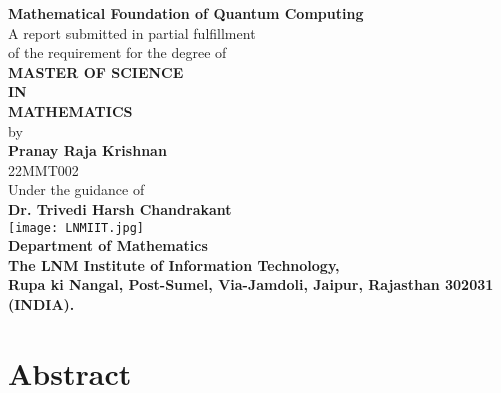 \documentclass[12pt,twoside,fleqn]{report}
\theoremstyle{thmstyle}
\begin{document}
\begin{titlepage}
    \begin{center}
        \vspace*{0.15cm}
        \Huge{\textbf{\large Mathematical Foundation of Quantum Computing}}\\
        \vspace{0.25cm}
        \small
        A report submitted in partial fulfillment\\
        of the requirement for the  degree of  \\
        \vspace{0.15cm}
        \textbf{MASTER OF SCIENCE \\ IN \\ MATHEMATICS}\\
        \vspace{0.25cm}
        by\\ \vspace{0.25cm}
        \large
        \textbf{Pranay Raja Krishnan}\\
        \vspace{0.15cm}
        \large{22MMT002}\\
        \vspace{0.15cm}
        Under the guidance of\\
        \vspace{0.15cm}
        \textbf{Dr. Trivedi Harsh Chandrakant}\\

        \vspace{1cm}
        \texttt{[image: LNMIIT.jpg]}\\
        \vspace{1cm}
        \large
        \textbf{Department of Mathematics\\
        The LNM Institute of Information Technology,\\ Rupa ki Nangal, Post-Sumel, Via-Jamdoli, Jaipur, Rajasthan 302031 (INDIA).}\\%
    \end{center}
\end{titlepage}

\newpage

\chapter*{Abstract}
\end{document}
